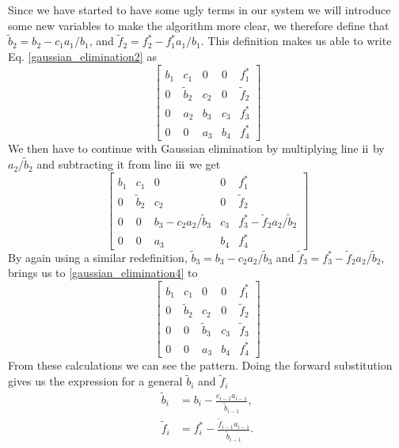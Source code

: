 \documentclass[%
 reprint,
nofootinbib,
 amsmath,amssymb,
 aps,
]{revtex4-1}
\newcommand{\RN}[1]{%
  \textup{\uppercase\expandafter{\romannumeral#1}}%
}
\begin{document}
Since we have started to have some ugly terms in our system we will introduce some new variables to make the algorithm more clear, we therefore define that $\tilde{b}_2 = b_2-c_1a_1/b_1$, and  $\tilde{f}_2 = f^{*}_2- f^{*}_1a_1/b_1$. This definition makes us able to write Eq. \eqref{gaussian_elimination2} as
\begin{equation}
  \begin{bmatrix}
      b_1 & c_1   & 0   & 0 &   f^{*}_1             \\
      0 & \tilde{b}_2 & c_2 & 0 &   \tilde{f}_2  \\
      0   & a_2 & b_3 & c_3 & f^{*}_3 \\
      0   & 0   & a_3 & b_4 & f^{*}_4
  \end{bmatrix} \label{gaussian_elimination3}
\end{equation}
We then have to continue with Gaussian elimination by multiplying line $\RN{2}$ by $a_2/\tilde{b}_2$ and subtracting it from line $\RN{3}$ we get
\begin{equation}
  \begin{bmatrix}
      b_1 & c_1   & 0   & 0 &   f^{*}_1             \\
      0 & \tilde{b}_2 & c_2 & 0 &   \tilde{f}_2  \\
      0   & 0 & b_3-c_2a_2/\tilde{b}_3 & c_3 & f^{*}_3-\tilde{f}_2a_2/\tilde{b}_2 \\
      0   & 0   & a_3 & b_4 & f^{*}_4
  \end{bmatrix} \label{gaussian_elimination4}
\end{equation}
By again using a similar redefinition, $\tilde{b}_3 = b_3-c_2a_2/\tilde{b}_3$ and $\tilde{f}_3 = f^{*}_3-\tilde{f}_2a_2/\tilde{b}_2$, brings us to \eqref{gaussian_elimination4} to
\begin{equation}
  \begin{bmatrix}
      b_1 & c_1   & 0   & 0 &   f^{*}_1               \\
      0 & \tilde{b}_2 & c_2 & 0 &   \tilde{f}_2  \\
      0   & 0 & \tilde{b}_3 & c_3 & \tilde{f}_3\\
      0   & 0   & a_3 & b_4 & f^{*}_4
  \end{bmatrix} \label{gaussian_elimination10}
\end{equation}
From these calculations we can see the pattern. Doing the forward substitution gives us the expression for a general $\tilde{b}_i$ and $\tilde{f}_i$
\begin{align}
  \tilde{b}_i &= b_i - \frac{c_{i-1}a_{i-1}}{\tilde{b}_{i-1}}, \label{eq: btilde} \\
  \tilde{f}_i &= f^{*}_i - \frac{\tilde{f}_{i-1}a_{i-1}}{\tilde{b}_{i-1}}. \label{eq: ftilde}
\end{align}
\end{document}
